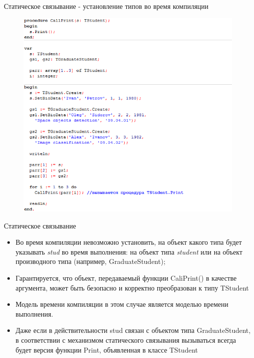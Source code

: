 \documentclass{beamer}
\begin{document}
\begin{frame}{Статическое связывание - установление типов во время компиляции}
\begin{figure}[h]
\centering
\includegraphics[scale=0.4]{images/lec07-pic02.png}
\end{figure}
\end{frame}

\begin{frame}{Статическое связывание}
\begin{itemize}
\item Во время компиляции невозможно установить, на объект какого типа будет указывать \textit{stud} во время выполнения: на объект типа \textit{student} или на объект производного типа (например, GraduateStudent);
\item Гарантируется, что объект, передаваемый функции CaliPrint() в качестве
аргумента, может быть безопасно и корректно преобразован к типу TStudent
\item Модель времени компиляции в этом случае является моделью времени выполнения. 
\item Даже если в действительности stud связан с объектом типа GraduateStudent, в соответствии с механизмом
статического связывания вызываться всегда будет версия функции Print, объявленная в классе TStudent
\end{itemize}
\end{frame}
\end{document}
